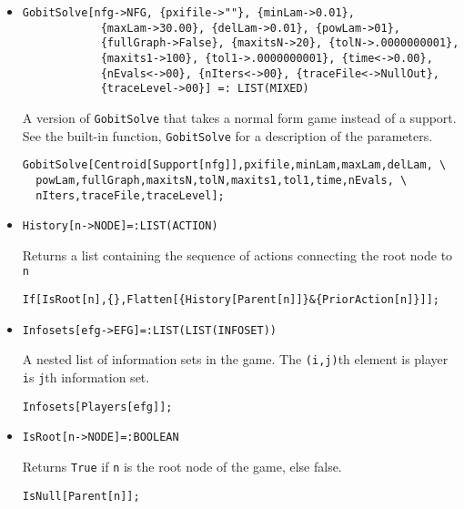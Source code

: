 \begin{itemize}
\item{}
\protect \large \begin{verbatim}
GobitSolve[nfg->NFG, {pxifile->""}, {minLam->0.01}, 
            {maxLam->30.00}, {delLam->0.01}, {powLam->01}, 
            {fullGraph->False}, {maxitsN->20}, {tolN->.0000000001}, 
            {maxits1->100}, {tol1->.0000000001}, {time<->0.00}, 
            {nEvals<->00}, {nIters<->00}, {traceFile<->NullOut}, 
            {traceLevel->00}] =: LIST(MIXED)
\end{verbatim}\normalsize

\bd 
A version of \verb+GobitSolve+ that takes a normal form
game instead of a support.  See the built-in function,
\verb+GobitSolve+ for a description of the parameters.
\begin{verbatim}
GobitSolve[Centroid[Support[nfg]],pxifile,minLam,maxLam,delLam, \
  powLam,fullGraph,maxitsN,tolN,maxits1,tol1,time,nEvals, \
  nIters,traceFile,traceLevel];
\end{verbatim} 
\ed

\item{}
\protect \large \begin{verbatim}
History[n->NODE]=:LIST(ACTION)
\end{verbatim}\normalsize

\bd 
Returns a list containing the sequence of actions connecting the root
node to \verb+n+
\begin{verbatim}
If[IsRoot[n],{},Flatten[{History[Parent[n]]}&{PriorAction[n]}]];
\end{verbatim} 
\ed


\item{}
\protect \large \begin{verbatim}
Infosets[efg->EFG]=:LIST(LIST(INFOSET))
\end{verbatim}\normalsize

\bd 
A nested list of information sets in the game. The \verb+(i,j)+th
element is player \verb+i+s \verb+j+th information set.  
\begin{verbatim}
Infosets[Players[efg]];
\end{verbatim} 
\ed

\item{}
\protect \large \begin{verbatim}
IsRoot[n->NODE]=:BOOLEAN
\end{verbatim}\normalsize

\bd 
Returns \verb+True+ if \verb+n+ is the root node of the game, else
false.  
\begin{verbatim}
IsNull[Parent[n]];
\end{verbatim} 
\ed


\end{itemize}
